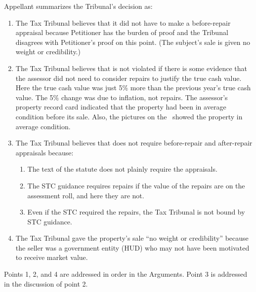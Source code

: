 \documentclass[12pt,\documentclassflag]{michiganCourtOfAppealsBrief}
\begin{document}
Appellant summarizes the Tribunal's decision as:

\begin{enumerate}
  
\item The Tax Tribunal believes that it did not have to make a before-repair appraisal because Petitioner has the burden of proof and the Tribunal disagrees with Petitioner's proof on this point. (The subject's sale is given no weight or credibility.)
  
\item The Tax Tribunal believes that \mathieuGast is not violated if there is some evidence that the assessor did not need to consider repairs to justify the true cash value. Here the true cash value was just 5\% more than the previous year's true cash value. The 5\% change was due to inflation, not repairs. The assessor's property record card indicated that the property had been in average condition before its sale. Also, the pictures on the \MLS\ showed the property in average condition.
  
\item The Tax Tribunal believes that \mathieuGast does not require before-repair and after-repair appraisals because:
  \begin{enumerate}
  \item The text of the statute does not plainly require the appraisals.
  \item The STC guidance requires repairs if the value of the repairs are on the assessment roll, and here they are not.
  \item Even if the STC required the repairs, the Tax Tribunal is not bound by STC guidance.
  \end{enumerate}

\item The Tax Tribunal gave the property's sale ``no weight or credibility'' because the seller was a government entity (HUD) who may not have been motivated to receive market value.
  
\end{enumerate}

Points 1, 2, and 4 are addressed in order in the Arguments. Point 3 is addressed in the discussion of point 2.  


	
\end{document}
